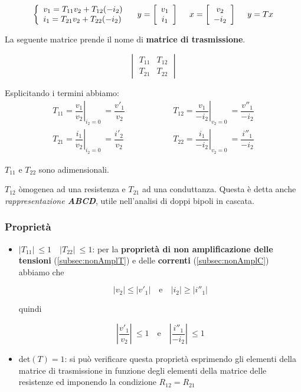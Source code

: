\documentclass[a4paper]{report}
\begin{document}
\[
\left\{
\begin{array}{l l}
  v_1=T_{11}v_2+T_{12}(-i_2)\\
  i_1=T_{21}v_2+T_{22}(-i_2)
\end{array}\right.
\quad y=
\left[
  \begin{array}{c}
    v_1\\
    i_1
  \end{array}\right]\
\quad x=
\left[
  \begin{array}{c}
    v_2\\
    -i_2
  \end{array}\right]\ 
\quad y=Tx
\]

La seguente matrice prende il nome di {\bf matrice di trasmissione}.

\[
\begin{vmatrix}
  T_{11} & T_{12}\\
  T_{21} & T_{22}
\end{vmatrix}
\]

Esplicitando i termini abbiamo:
\[
\begin{matrix}
  T_{11}=\left. \dfrac{v_1}{v_2}\right|_{i_2=0} \ =\dfrac{v'_1}{v_2} &
  \quad \quad \quad \quad \quad
  T_{12}=\left. \dfrac{v_1}{-i_2}\right|_{v_2=0} \ =\dfrac{v''_1}{-i_2}\\[.5cm]
  T_{21}=\left. \dfrac{i_1}{v_2}\right|_{i_2=0} \ =\dfrac{i'_2}{v_2} &
  \quad \quad \quad \quad \quad
  T_{22}=\left. \dfrac{i_1}{-i_2}\right|_{v_2=0} \ =\dfrac{i''_1}{-i_2}
\end{matrix}
\]

$T_{11}$ e $T_{22}$ sono adimensionali.

$T_{12}$ \` omogenea ad una resistenza e $T_{21}$ ad una conduttanza.
Questa \`e detta anche \emph{rappresentazione {\bf ABCD}}, utile
nell'analisi di doppi bipoli in cascata.

\subsubsection{Propriet\`a}

\begin{itemize} 
  
\item $|T_{11}|\ \leq 1 \quad |T_{22}|\ \leq 1$: per la {\bf
  propriet\`a di non amplificazione delle tensioni} (\ref{subsec:nonAmplT}) e delle {\bf
  correnti} (\ref{subsec:nonAmplC}) abbiamo che

  \[
  |v_2| \leq |v'_1| \quad \text{e} \quad |i_2| \geq |i''_1|
  \]

  quindi

  \[
  \left|
  \dfrac{v'_1}{v_2}
  \right|\ \leq 1 \quad \text{e} \quad
  \left|
  \dfrac{i''_1}{-i_2}  
  \right|\ \leq 1
  \]

  \item det$(T)=1$: si pu\`o verificare questa propriet\`a esprimendo
    gli elementi della matrice di trasmissione in funzione degli
    elementi della matrice delle resistenze ed imponendo la condizione $R_{12}=R_{21}$
\end{itemize}
\end{document}
